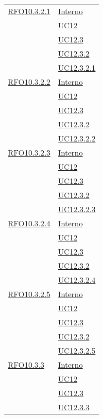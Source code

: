 \begin{longtable}{|>{\centering}m{5cm}|m{5cm}<{\centering}|}
 \hyperlink{RFO10.3.2.1}{RFO10.3.2.1} 
& \hyperlink{Interno}{Interno}\\
& \hyperref[UC12]{UC12}\\
& \hyperref[UC12.3]{UC12.3}\\
& \hyperref[UC12.3.2]{UC12.3.2}\\
& \hyperref[UC12.3.2.1]{UC12.3.2.1}\\\hline

 \hyperlink{RFO10.3.2.2}{RFO10.3.2.2} 
& \hyperlink{Interno}{Interno}\\
& \hyperref[UC12]{UC12}\\
& \hyperref[UC12.3]{UC12.3}\\
& \hyperref[UC12.3.2]{UC12.3.2}\\
& \hyperref[UC12.3.2.2]{UC12.3.2.2}\\\hline

 \hyperlink{RFO10.3.2.3}{RFO10.3.2.3} 
& \hyperlink{Interno}{Interno}\\
& \hyperref[UC12]{UC12}\\
& \hyperref[UC12.3]{UC12.3}\\
& \hyperref[UC12.3.2]{UC12.3.2}\\
& \hyperref[UC12.3.2.1]{UC12.3.2.3}\\\hline

 \hyperlink{RFO10.3.2.4}{RFO10.3.2.4} 
& \hyperlink{Interno}{Interno}\\
& \hyperref[UC12]{UC12}\\
& \hyperref[UC12.3]{UC12.3}\\
& \hyperref[UC12.3.2]{UC12.3.2}\\
& \hyperref[UC12.3.2.4]{UC12.3.2.4}\\\hline

 \hyperlink{RFO10.3.2.5}{RFO10.3.2.5} 
& \hyperlink{Interno}{Interno}\\
& \hyperref[UC12]{UC12}\\
& \hyperref[UC12.3]{UC12.3}\\
& \hyperref[UC12.3.2]{UC12.3.2}\\
& \hyperref[UC12.3.2.5]{UC12.3.2.5}\\\hline

 \hyperlink{RFO10.3.3}{RFO10.3.3} 
& \hyperlink{Interno}{Interno}\\
& \hyperref[UC12]{UC12}\\
& \hyperref[UC12.3]{UC12.3}\\
& \hyperref[UC12.3.3]{UC12.3.3}\\\hline


\end{longtable}
